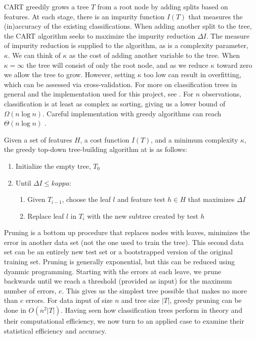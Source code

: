 \documentclass[12pt,letterpaper]{article}
\begin{document}
CART greedily grows a tree $T$ from a root node by adding splits based on features. At each stage, there is an impurity function $I(T)$ that measures the (in)accuracy of the existing classifications. When adding another split to the tree, the CART algorithm seeks to maximize the impurity reduction $\Delta I$. The measure of impurity reduction is supplied to the algorithm, as is a complexity parameter, $\kappa$. We can think of $\kappa$ as the cost of adding another variable to the tree. When $\kappa=\infty$ the tree will consist of only the root node, and as we reduce $\kappa$ toward zero we allow the tree to grow. However, setting $\kappa$ too low can result in overfitting, which can be assessed via cross-validation. For more on classification trees in general and the implementation used for this project, see \citep{murphy2012machine,olshen1984classification,therneau1997introduction}. For $n$ observations, classification is at least as complex as sorting, giving us a lower bound of $\Omega(n \log n)$. Careful implementation with greedy algorithms can reach $\Theta(n \log n)$ \citep{latkowski2003high}. 

Given a set of features $H$, a cost function $I(T)$, and a minimum complexity $\kappa$, the greedy top-down tree-building algorithm at is as follows:

\begin{enumerate}
  \item Initialize the empty tree, $T_0$
  \item Until $\Delta I \leq kappa$:
  \begin{enumerate}
  	\item Given $T_{i-1}$, choose the leaf $l$ and feature test $h \in H$ that maximizes $\Delta I$
  	\item Replace leaf $l$ in $T_i$ with the new subtree created by test $h$
  \end{enumerate}
\end{enumerate}

Pruning is a bottom up procedure that replaces nodes with leaves, minimizes the error in another data set (not the one used to train the tree). This second data set can be an entirely new test set or a bootstrapped version of the original training set. Pruning is generally exponential, but this can be reduced using dyanmic programming. Starting with the errors at each leave, we prune backwards until we reach a threshold (provided as input) for the maximum number of errors, $e$. This gives us the simplest tree possible that makes no more than $e$ errors. For data input of size $n$ and tree size $|T|$, greedy pruning can be done in $O(n^2 |T|)$. Having seen how classification trees perform in theory and their computational efficiency, we now turn to an applied case to examine their statistical efficiency and accuracy.
\end{document}
